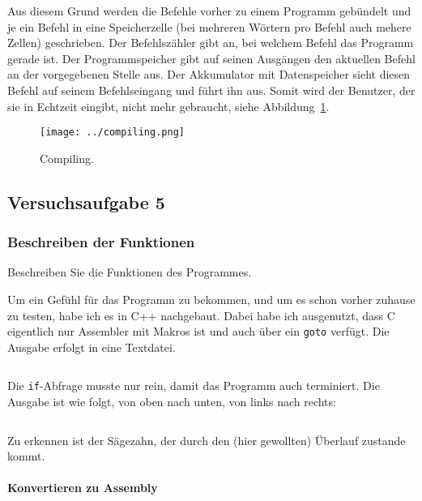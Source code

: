 Aus diesem Grund werden die Befehle vorher zu einem Programm gebündelt und je
ein Befehl in eine Speicherzelle (bei mehreren Wörtern pro Befehl auch mehere
Zellen) geschrieben. Der Befehlszähler gibt an, bei welchem Befehl das Programm
gerade ist. Der Programmspeicher gibt auf seinen Ausgängen den aktuellen Befehl
an der vorgegebenen Stelle aus. Der Akkumulator mit Datenspeicher sieht diesen
Befehl auf seinem Befehlseingang und führt ihn aus. Somit wird der Benutzer,
der sie in Echtzeit eingibt, nicht mehr gebraucht, siehe
Abbildung~\ref{fig:compiling}.

\begin{figure}[htbp]
	\centering
	\texttt{[image: ../compiling.png]}
	\caption{%
		Compiling. \cite{xkcd/303}
	}
	\label{fig:compiling}
\end{figure}

\subsection{Versuchsaufgabe 5}

\subsubsection{Beschreiben der Funktionen}

\begin{problem}
	Beschreiben Sie die Funktionen des Programmes.
\end{problem}

Um ein Gefühl für das Programm zu bekommen, und um es schon vorher zuhause zu
testen, habe ich es in C++ nachgebaut. Dabei habe ich ausgenutzt, dass C
eigentlich nur Assembler mit Makros ist und auch über ein \texttt{goto}
verfügt. Die Ausgabe erfolgt in eine Textdatei.

\inputminted[fontsize=\small, linenos]{cpp}{../Prototypen/saegezahn.cpp}

Die \texttt{if}-Abfrage musste nur rein, damit das Programm auch terminiert.
Die Ausgabe ist wie folgt, von oben nach unten, von links nach rechts:

\begin{multicols}{9}
	\inputminted[fontsize=\footnotesize]{text}{saegezahn.txt}
\end{multicols}

Zu erkennen ist der Sägezahn, der durch den (hier gewollten) Überlauf zustande
kommt.

\paragraph{Konvertieren zu Assembly}

